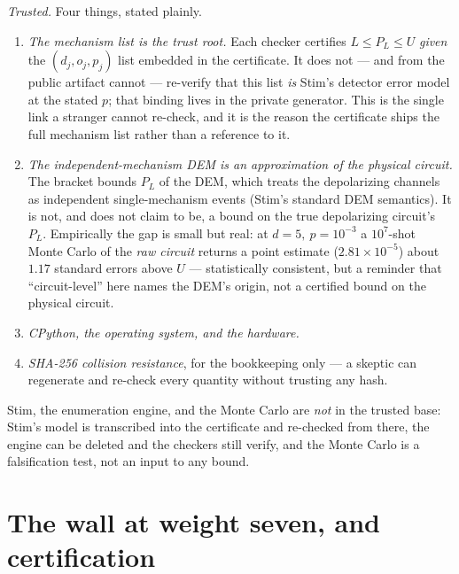 \documentclass[11pt]{amsart}
\newcommand{\PL}{P_{L}}
\theoremstyle{plain}
\theoremstyle{definition}
\theoremstyle{remark}
\begin{document}
\emph{Trusted.} Four things, stated plainly.
\begin{enumerate}
\item \emph{The mechanism list is the trust root.} Each checker certifies
$L\le\PL\le U$ \emph{given} the $(d_j,o_j,p_j)$ list embedded in the
certificate. It does not --- and from the public artifact cannot --- re-verify
that this list \emph{is} Stim's detector error model at the stated $p$; that
binding lives in the private generator. This is the single link a stranger
cannot re-check, and it is the reason the certificate ships the full mechanism
list rather than a reference to it.
\item \emph{The independent-mechanism DEM is an approximation of the physical
circuit.} The bracket bounds $\PL$ of the DEM, which treats the depolarizing
channels as independent single-mechanism events (Stim's standard DEM
semantics). It is not, and does not claim to be, a bound on the true
depolarizing circuit's $\PL$. Empirically the gap is small but real: at
$d=5,\ p=10^{-3}$ a $10^7$-shot Monte Carlo of the \emph{raw circuit} returns a
point estimate ($2.81\times10^{-5}$) about $1.17$ standard errors above $U$ ---
statistically consistent, but a reminder that ``circuit-level'' here names the
DEM's origin, not a certified bound on the physical circuit.
\item \emph{CPython, the operating system, and the hardware.}
\item \emph{SHA-256 collision resistance}, for the bookkeeping only --- a
skeptic can regenerate and re-check every quantity without trusting any hash.
\end{enumerate}

\noindent Stim, the enumeration engine, and the Monte Carlo are \emph{not} in
the trusted base: Stim's model is transcribed into the certificate and
re-checked from there, the engine can be deleted and the checkers still verify,
and the Monte Carlo is a falsification test, not an input to any bound.

\section{The wall at weight seven, and certification}\label{sec:wall}
\end{document}
